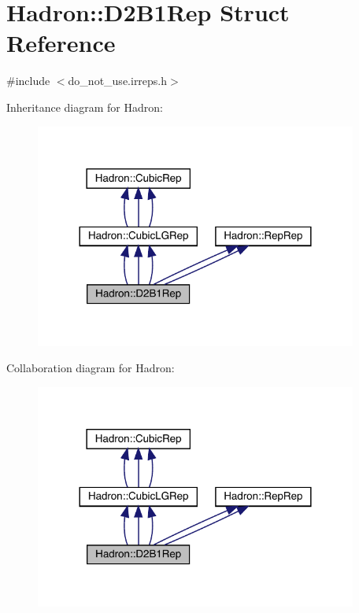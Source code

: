\hypertarget{structHadron_1_1D2B1Rep}{}\section{Hadron\+:\+:D2\+B1\+Rep Struct Reference}
\label{structHadron_1_1D2B1Rep}


{\ttfamily \#include $<$do\+\_\+not\+\_\+use.\+irreps.\+h$>$}



Inheritance diagram for Hadron\+:
\nopagebreak
\begin{figure}[H]
\begin{center}
\leavevmode
\includegraphics[width=300pt]{d8/d3f/structHadron_1_1D2B1Rep__inherit__graph}
\end{center}
\end{figure}


Collaboration diagram for Hadron\+:
\nopagebreak
\begin{figure}[H]
\begin{center}
\leavevmode
\includegraphics[width=300pt]{da/d6c/structHadron_1_1D2B1Rep__coll__graph}
\end{center}
\end{figure}
